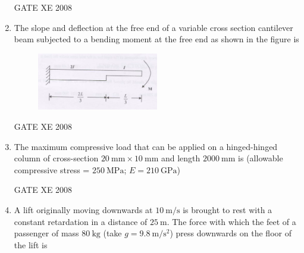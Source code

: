 \documentclass[12pt]{article}
\begin{document}
\begin{enumerate}
    GATE XE 2008  
    
    \item The slope and deflection at the free end of a variable cross section cantilever beam subjected to a bending moment at the free end as shown in the figure is  

    \begin{figure}[H]
    \centering
    \includegraphics[width=0.5\textwidth]{figs/ass1_d_q26.png}
    \caption{}
    \end{figure}

\begin{enumerate}
\end{enumerate}
    
    GATE XE 2008  
    
    \item The maximum compressive load that can be applied on a hinged-hinged column of cross-section $20\ \mathrm{mm} \times 10\ \mathrm{mm}$ and length $2000\ \mathrm{mm}$ is (allowable compressive stress = $250\ \mathrm{MPa}$; $E = 210\ \mathrm{GPa}$)  

\begin{enumerate}
\end{enumerate}
    
    GATE XE 2008  
    
    \item A lift originally moving downwards at $10\ \mathrm{m/s}$ is brought to rest with a constant retardation in a distance of $25\ \mathrm{m}$. The force with which the feet of a passenger of mass $80\ \mathrm{kg}$ (take $g = 9.8\ \mathrm{m/s^2}$) press downwards on the floor of the lift is 


\end{enumerate}
\end{document}
